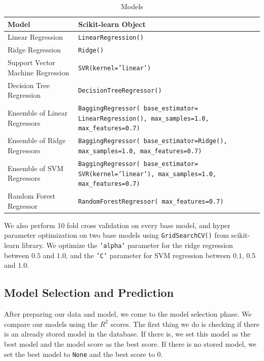 \begin{table}[htbp]
  \caption[Models]{Models}\label{tab:models}
  \centering
  \begin{tabular}{l|p{6cm}}
    Model&Scikit-learn Object\\ \toprule
    Linear Regression&\texttt{LinearRegression()}\\ \hline
    Ridge Regression&\texttt{Ridge()}\\ \hline
    Support Vector Machine Regression&\texttt{SVR(kernel='linear')}\\ \hline
    Decision Tree Regression&\texttt{DecisionTreeRegressor()}\\ \hline
    Ensemble of Linear Regressors&\texttt{BaggingRegressor( base\_estimator= LinearRegression(), max\_samples=1.0, max\_features=0.7)}\\ \hline
    Ensemble of Ridge Regressors &\texttt{BaggingRegressor( base\_estimator=Ridge(), max\_samples=1.0, max\_features=0.7)}\\ \hline
    Ensemble of SVM Regressors &\texttt{BaggingRegressor( base\_estimator= SVR(kernel='linear'), max\_samples=1.0, max\_features=0.7)}\\ \hline
    Random Forest Regressor&\texttt{RandomForestRegressor( max\_features=0.7)}\\ \hline
  \end{tabular}
\end{table}

We also perform 10 fold cross validation on every base model, and hyper parameter optimization on two base models using \texttt{GridSearchCV()} from scikit-learn library.
We optimize the \texttt{'alpha'} parameter for the ridge regression between $0.5$ and $1.0$, 
and the \texttt{'C'} parameter for SVM regression between $0.1$, $0.5$ and $1.0$.

\subsection{Model Selection and Prediction}
After preparing our data and model, we come to the model selection phase.
We compare our models using the $R^2$ scores.
The first thing we do is checking if there is an already stored model in the database.
If there is, we set this model as the best model and the model score as the best score.
If there is no stored model, we set the best model to \texttt{None} and the best score to $0$.

